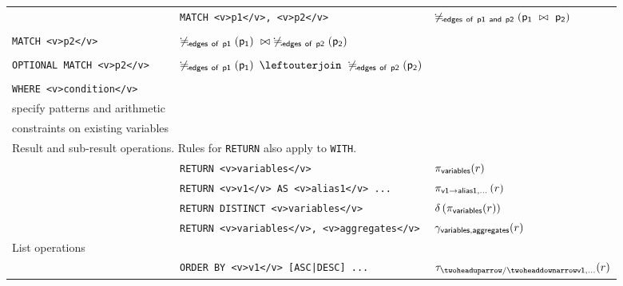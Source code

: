 \begin{table}[htbp]
\begin{tabular}{|l|l|l|}
		& \lstinline+MATCH <v>p1</v>, <v>p2</v>+ &
		$\not\fallingdotseq_{\mathsf{\mathsf{edges~of~p1~and~p2}}} \left( \mathsf{p_1}~\bowtie~\mathsf{p_2} \right)$ \\ \cline{2-3}

		& \breakable{
			\lstinline+MATCH <v>p1</v>+ \\
			\lstinline+MATCH <v>p2</v>+
		} &
		$\not\fallingdotseq_{\mathsf{\mathsf{edges~of~p1}}} \left(\mathsf{p_1}\right)~\bowtie~\not\fallingdotseq_{\mathsf{\mathsf{edges~of~p2}}} \left(\mathsf{p_2}\right)$ \\ \cline{2-3}

		& \breakable{
			\lstinline+MATCH <v>p1</v>+ \\
			\lstinline+OPTIONAL MATCH <v>p2</v>+
		} & $\alldifferent{\atom{edges~of~p1}} \left(\atom{p_1}\right)~\myleftouterjoin~\alldifferent{\atom{edges~of~p2}} \left(\atom{p_2}\right)$ \\ \cline{2-3}

		& \breakable{
			\lstinline+MATCH <v>p</v>+ \\
			\lstinline+WHERE <v>condition</v>+
		} & \breakable{$\selection{\atom{condition}}{\left( r \right)}$, where $\atom{condition}$ may \tabularnewline specify patterns and arithmetic \tabularnewline constraints on existing variables} \\ \cline{2-3}

		\hline \multicolumn{3}{|l|}{Result and sub-result operations. Rules for \lstinline+RETURN+ also apply to \lstinline+WITH+.} \\ \cline{2-3}

		& \lstinline+RETURN <v>variables</v>+ & $\pi_{\mathsf{\mathsf{variables}}}{\left( r \right)}$ \\ \cline{2-3}

		& \lstinline+RETURN <v>v1</v> AS <v>alias1</v> ...+ & $\pi_{\mathsf{\mathsf{v1} \rightarrow \mathsf{alias1}, \ldots }}\left( r \right)$ \\ \cline{2-3}

		& \lstinline+RETURN DISTINCT <v>variables</v>+ & $\delta\left(\pi_{\mathsf{\mathsf{variables}}}{\left( r \right)}\right)$ \\ \cline{2-3}

		& \lstinline+RETURN <v>variables</v>, <v>aggregates</v>+ & $\gamma_{\mathsf{\mathsf{variables}, \mathsf{aggregates}}}{\left( r \right)}$ \\ \cline{2-3}

		\hline \multicolumn{3}{|l|}{List operations } \\ \cline{2-3}

		& \lstinline+ORDER BY <v>v1</v> [ASC|DESC] ...+ & $\sort{\asc/\desc \atom{v1}, \ldots}{\left( r \right)}$ \\ \cline{2-3}


\end{tabular}
\end{table}
